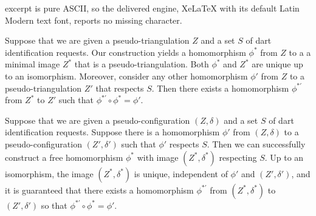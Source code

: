 \documentclass[10pt,a4paper]{amsart}
\begin{document}
excerpt is pure ASCII, so the delivered engine, XeLaTeX with its default Latin Modern text font, reports no missing character.
\begin{lem}\label{lem:free-homo-trian}
Suppose that we are given a pseudo-triangulation $Z$ and a set $S$ of dart identification requests. Our construction yields
a homomorphism $\phi^*$ from $Z$ to a a minimal image $Z^*$
that is a pseudo-triangulation. Both $\phi^*$ and $Z^*$ are unique up to an isomorphism. 
Moreover, consider any other homomorphism $\phi'$ from $Z$ to a 
pseudo-triangulation $Z'$ that respects $S$. Then there
exists a homomorphism $\phi^{*\prime}$ from $Z^*$ to $Z'$ such that 
$\phi^{*\prime}\circ\phi^*=\phi'$.
\end{lem}

 \begin{lem}\label{lem:free-homo-conf}
Suppose that we are given a pseudo-configuration $(Z,\delta)$ and a set $S$ of dart identification requests. Suppose there is a homomorphism $\phi'$ from $(Z,\delta)$ to a pseudo-configuration $(Z',\delta')$ such that $\phi'$ respects $S$.
Then we can 
successfully construct a free homomorphism $\phi^*$ with image $(Z^*,\delta^*)$ respecting $S$. Up to an isomorphism,
the image $(Z^*,\delta^*)$ 
is unique, independent of  $\phi'$ and $(Z',\delta')$, and it is guaranteed that there
exists a homomorphism $\phi^{*\prime}$ from $(Z^*,\delta^*)$ to $(Z',\delta')$ so that 
$\phi^{*\prime}\circ\phi^*=\phi'$.
\end{lem}
\end{document}
